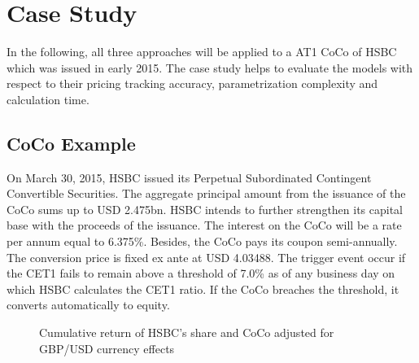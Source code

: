 \chapter{Case Study}\label{empiricalanalysis}
In the following, all three approaches will be applied to a AT1 CoCo of HSBC which was issued in early 2015. The case study helps to evaluate the models with respect to their pricing tracking accuracy, parametrization complexity and calculation time. 

\section{CoCo Example}
On March 30, 2015, HSBC issued its Perpetual Subordinated Contingent Convertible Securities. The aggregate principal amount from the issuance of the CoCo sums up to USD 2.475bn. HSBC intends to further strengthen its capital base with the proceeds of the issuance. The interest on the CoCo will be a rate per annum equal to 6.375\%. Besides, the CoCo pays its coupon semi-annually. The conversion price is fixed ex ante at USD 4.03488. The trigger event occur if the CET1 fails to remain above a threshold of 7.0\% as of any business day on which HSBC calculates the CET1 ratio. If the CoCo breaches the threshold, it converts automatically to equity.

\begin{figure}[H]
\centering
{}
\caption[Cumulative return of HSBC's CoCo and share]{Cumulative return of HSBC's share and CoCo adjusted for GBP/USD currency effects}
\label{fig:cumulative}
\end{figure}


